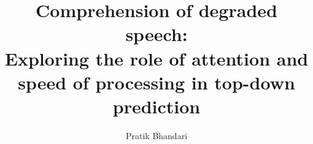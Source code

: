 \documentclass[a4paper, nobind]{templates/ociamthesis}
\title{Comprehension of degraded speech:\\
Exploring the role of attention and speed of processing in top-down prediction}
\author{Pratik Bhandari}
\begin{document}
\setlength{\textbaselineskip}{22pt plus2pt}

\setlength{\frontmatterbaselineskip}{17pt plus1pt minus1pt}

\setlength{\abstractseparatelineskip}{13pt plus1pt minus1pt}
\setlength{\abstractseparateparskip}{0pt plus 1pt}

\setlength{\parskip}{2pt plus 1pt}

%
%
\def\crest{{\texttt{[image: templates/beltcrest.png]}}}
\renewcommand{\university}{Saarland University}
\renewcommand{\submittedtext}{A thesis submitted for the degree of}
\renewcommand{\thesistitlesize}{\fontsize{22pt}{28pt}\selectfont}
\renewcommand{\gapbeforecrest}{25mm}
\renewcommand{\gapaftercrest}{25mm}


\setlength{\baselineskip}{\textbaselineskip}



\setcounter{secnumdepth}{2}
\setcounter{tocdepth}{2}


\end{document}
